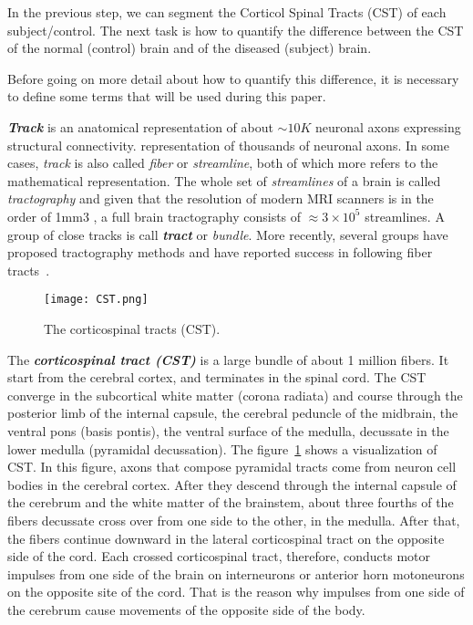\label{subsec:experiments_quatification}
In the previous step, we can segment the Corticol Spinal Tracts (CST) of each subject/control. The next task is how to quantify the difference between the CST of the normal (control) brain and of the diseased (subject) brain.

Before going on more detail about how to quantify this difference, it is necessary to define some terms that will be used during this paper.

\textit{\textbf{Track}} is an anatomical representation of about $\sim10K$ neuronal axons expressing structural connectivity. representation of thousands of neuronal axons. In some cases, \textit{track} is also called \textit{fiber} or \textit{streamline}, both of which more refers to the mathematical representation. The whole set of \textit{streamlines} of a brain is called \textit{tractography} and given that the resolution of modern MRI scanners is in the order of 1mm3 , a full brain tractography consists of $\approx3\times10^5$ streamlines. A group of close tracks is call \textit{\textbf{tract}} or \textit{bundle}. More recently, several groups have proposed tractography methods and have reported success in following fiber tracts~\cite{zhang2008identifying}.

\begin{figure}
  \centering
  \texttt{[image: CST.png]}
  \caption{The corticospinal tracts (CST).}
  \label{fig:CST}
\end{figure}

The \textit{\textbf{corticospinal tract (CST)}} is a large bundle of about 1 million fibers. It start from the cerebral cortex, and terminates in the spinal cord. The CST converge in the subcortical white matter (corona radiata) and course through the posterior limb of the internal capsule, the cerebral peduncle of the midbrain, the ventral pons (basis pontis), the ventral surface of the medulla, decussate in the lower medulla (pyramidal decussation). The figure~\ref{fig:CST} shows a visualization of CST. In this figure, axons that compose pyramidal tracts come from neuron cell bodies in the cerebral cortex. After they descend through the internal capsule of the cerebrum and the white matter of the brainstem, about three fourths of the fibers decussate cross over from one side to the other, in the medulla. After that, the fibers continue downward in the lateral corticospinal tract on the opposite side of the cord. Each crossed corticospinal tract, therefore, conducts motor impulses from one side of the brain on interneurons or anterior horn motoneurons on the opposite site of the cord. That is the reason why impulses from one side of the cerebrum cause movements of the opposite side of the body.


